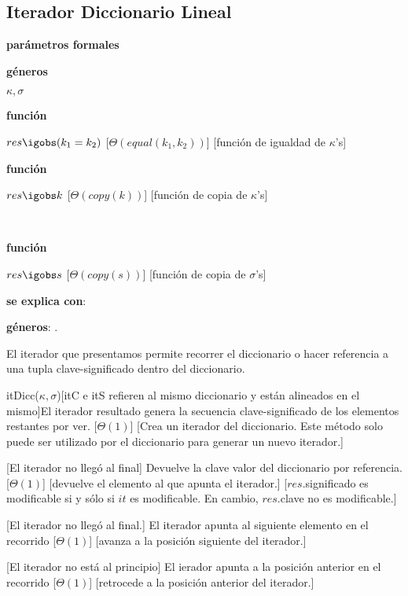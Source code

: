 \documentclass[a4paper,10pt]{article}
\begin{document}
\newpage

\subsection{Iterador Diccionario Lineal}

\begin{Interfaz}
  
  \textbf{parámetros formales}\parindent\\
  \parbox{1.7cm}{\textbf{géneros}}$\kappa,\sigma$\\
  \parbox[t]{1.7cm}{\textbf{función}}\parbox[t]{.5\textwidth-\parindent-1.7cm}{%
    {$res \igobs (k_1 = k_2)$}
    [$\Theta(equal(k_1, k_2))$]
    [función de igualdad de $\kappa$'s]
  }%
  \parbox[t]{1.7cm}{\textbf{función}}\parbox[t]{.5\textwidth-\parindent-1.7cm}{%
    {$res \igobs k$}
    [$\Theta(copy(k))$]
    [función de copia de $\kappa$'s]
  }\\[2ex]
  \parbox[t]{1.7cm}{\textbf{función}}\parbox[t]{.5\textwidth-\parindent-1.7cm}{%
    {$res \igobs s$}
    [$\Theta(copy(s))$]
    [función de copia de $\sigma$'s]
  }

  \textbf{se explica con}: 

  \textbf{géneros}: .

  El iterador que presentamos permite recorrer el diccionario o hacer 
    referencia a una tupla clave-significado dentro del diccionario. 
    
    {itDicc($\kappa,\sigma$)}[itC e itS refieren al mismo diccionario y están
    alineados en el mismo]{El iterador resultado genera la secuencia
    clave-significado de los elementos restantes por ver.}
  [$\Theta(1)$]
  [Crea un iterador del diccionario. Este método solo puede ser utilizado por
    el diccionario para generar un nuevo iterador.]

  [El iterador no llegó al final]
  {Devuelve la clave valor del diccionario por referencia.}
  [$\Theta(1)$]
  [devuelve el elemento al que apunta el iterador.]
  [$res$.significado es modificable si y sólo si $it$ es modificable.  En cambio, $res$.clave no es modificable.]

  [El iterador no llegó al final.]
  {El iterador apunta al siguiente elemento en el recorrido}
  [$\Theta(1)$]
  [avanza a la posición siguiente del iterador.]

  [El iterador no está al principio]
  {El ierador apunta a la posición anterior en el recorrido}
  [$\Theta(1)$]
  [retrocede a la posición anterior del iterador.]

\end{Interfaz}
\end{document}
